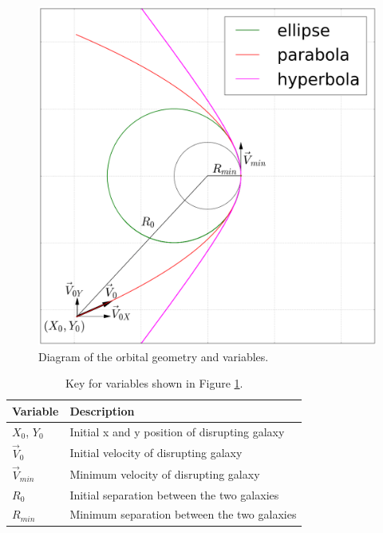 \documentclass[11pt]{article}
\begin{document}
\begin{figure}[h!]
\centering
\includegraphics[width=5in]{../Figure_A_1.png}
\caption{Diagram of the orbital geometry and variables.}
\label{geometry_fig}
\end{figure}

\begin{table}[h!]
\centering
\caption{Key for variables shown in Figure \ref{geometry_fig}.}
\begin{tabular}{l p{8cm}}
Variable & Description \\
\hline	%
$X_0$, $Y_0$ & Initial x and y position of disrupting galaxy \\
$\vec{V}_0$ & Initial velocity of disrupting galaxy \\
$\vec{V}_{min}$ & Minimum velocity of disrupting galaxy \\
$R_0$ & Initial separation between the two galaxies \\
$R_{min}$ & Minimum separation between the two galaxies \\
\end{tabular}
\label{table1}
\end{table}
\end{document}
